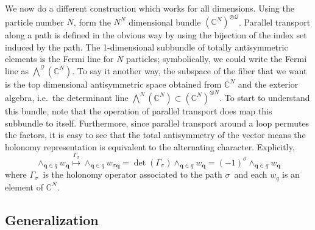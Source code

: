 \documentclass[11pt]{article}
\theoremstyle{remark}
\begin{document}
We now do a different construction which works for all dimensions. 
 Using the  particle number $N$, form the $N^N$ dimensional bundle
$(\ensuremath{\mathbb{C}}^N)^{\otimes \ensuremath{\mathcal{Q}}}$.
Parallel transport along a path is defined in the obvious way  
by using the bijection of the index set induced by the path. 
The 1-dimensional subbundle of totally
antisymmetric elements is the Fermi line for $N$
particles; symbolically, we could write the Fermi line as
$\bigwedge^{\ensuremath{\mathcal{Q}}}(\ensuremath{\mathbb{C}}^N)$. 
To say it another way, the subspace of the fiber that we
want is
the top
dimensional antisymmetric space obtained from  $\ensuremath{\mathbb{C}}^N$ and the
exterior algebra, i.e.\ the determinant line  
$\bigwedge^N (\ensuremath{\mathbb{C}}^N) \subset (\ensuremath{\mathbb{C}}^N)^{\otimes N}$. 
To start to understand this bundle, note that the operation of parallel
transport does map this subbundle to itself. Furthermore, since
parallel transport around a loop permutes the factors, it is easy to
see that the total antisymmetry of the vector 
means the holonomy representation is
equivalent to the alternating character. Explicitly, 
\begin{equation*}
\mathop{\wedge}_{\ensuremath{\boldsymbol{q}} \in \ensuremath{q}} \ensuremath{w}_{\ensuremath{\boldsymbol{q}}} 
\overset{\ensuremath{\Gamma_{\ensuremath{\sigma}}}}{\mapsto} 
\mathop{\wedge}_{\ensuremath{\boldsymbol{q}} \in \ensuremath{q}}{\ensuremath{w}_{\ensuremath{\sigma}\ensuremath{\boldsymbol{q}}}}
 = \det(\ensuremath{\Gamma_{\ensuremath{\sigma}}}) \mathop{\wedge}_{\ensuremath{\boldsymbol{q}} \in \ensuremath{q}} \ensuremath{w}_{\ensuremath{\boldsymbol{q}}}  
= (-1)^{\sigma} \mathop{\wedge}_{\ensuremath{\boldsymbol{q}} \in \ensuremath{q}} \ensuremath{w}_{\ensuremath{\boldsymbol{q}}}
\end{equation*}
where \ensuremath{\Gamma_{\ensuremath{\sigma}}}\ is the holonomy operator associated to the path \ensuremath{\sigma}\
and each $w_\ensuremath{q}$ is an element of $\ensuremath{\mathbb{C}}^N$.


\subsection{Generalization}  
\end{document}
